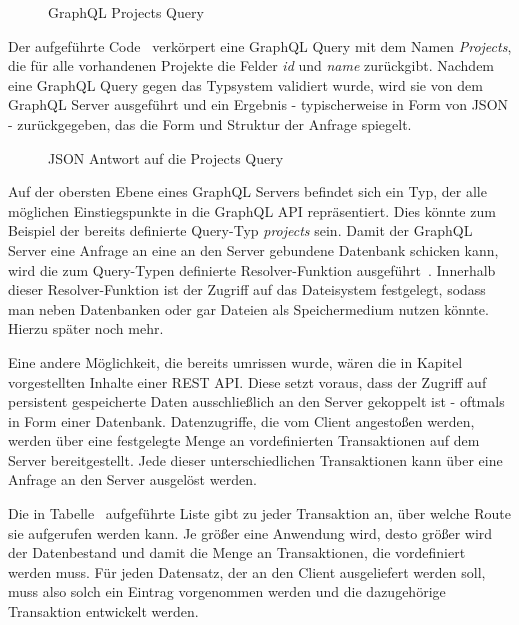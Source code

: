 \begin{figure}[h]
    
    \caption{GraphQL Projects Query}
    \label{fig:basics:graphql:6}
\end{figure}

Der aufgeführte Code~ verkörpert eine GraphQL Query mit dem Namen \emph{Projects}, die für alle vorhandenen Projekte die Felder \emph{id} und \emph{name}
zurückgibt. Nachdem eine GraphQL Query gegen das Typsystem validiert wurde, wird sie von dem GraphQL Server ausgeführt und
ein Ergebnis - typischerweise in Form von JSON - zurückgegeben, das die Form und Struktur der Anfrage spiegelt.

\begin{figure}[h]
    
    \caption{JSON Antwort auf die Projects Query}
    \label{fig:basics:graphql:7}
\end{figure}

Auf der obersten Ebene eines GraphQL Servers befindet sich ein Typ, der alle möglichen Einstiegspunkte in die GraphQL API repräsentiert.
Dies könnte zum Beispiel der bereits definierte Query-Typ \emph{projects} sein.
Damit der GraphQL Server eine Anfrage an eine an den Server gebundene Datenbank schicken kann, wird die zum Query-Typen definierte
Resolver-Funktion ausgeführt~\cite{graphql-execution}. Innerhalb dieser Resolver-Funktion ist der Zugriff auf das Dateisystem festgelegt, sodass
man neben Datenbanken oder gar Dateien als Speichermedium nutzen könnte. Hierzu später noch mehr.

Eine andere Möglichkeit, die bereits umrissen wurde, wären die in Kapitel~ vorgestellten Inhalte einer REST API.
Diese setzt voraus, dass der Zugriff auf persistent gespeicherte Daten ausschließlich an den Server gekoppelt ist - oftmals in Form einer Datenbank.
Datenzugriffe, die vom Client angestoßen werden, werden über eine festgelegte Menge an vordefinierten Transaktionen auf dem Server bereitgestellt.
Jede dieser unterschiedlichen Transaktionen kann über eine Anfrage an den Server ausgelöst werden.

Die in Tabelle~ aufgeführte Liste gibt zu jeder Transaktion an, über welche Route sie aufgerufen werden kann.
Je größer eine Anwendung wird, desto größer wird der Datenbestand und damit die Menge an Transaktionen, die vordefiniert werden muss.
Für jeden Datensatz, der an den Client ausgeliefert werden soll, muss also solch ein Eintrag vorgenommen werden und die dazugehörige Transaktion entwickelt werden.

